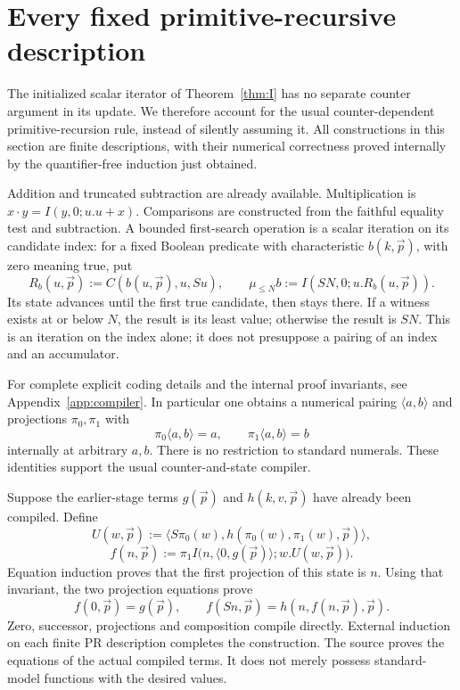 \documentclass[11pt]{article}
\theoremstyle{definition}
\begin{document}
\section{Every fixed primitive-recursive description}
\label{sec:compiler}

The initialized scalar iterator of Theorem~\ref{thm:I} has no separate
counter argument in its update. We therefore account for the usual
counter-dependent primitive-recursion rule, instead of silently assuming
it. All constructions in this section are finite descriptions, with
their numerical correctness proved internally by the quantifier-free
induction just obtained.

Addition and truncated subtraction are already available. Multiplication
is $x\cdot y=I(y,0;u.u+x)$. Comparisons are constructed from the
faithful equality test and subtraction. A bounded first-search operation
is a scalar iteration on its candidate index: for a fixed Boolean
predicate with characteristic $b(k,\vec p)$, with zero meaning true,
put
\[
 R_b(u,\vec p):=C(b(u,\vec p),u,Su),\qquad
 \mu_{\leq N}b:=I(SN,0;u.R_b(u,\vec p)).
\]
Its state advances until the first true candidate, then stays there.
If a witness exists at or below $N$, the result is its least value;
otherwise the result is $SN$. This is an iteration on the index alone;
it does not presuppose a pairing of an index and an accumulator.

For complete explicit coding details and the internal proof invariants,
see Appendix~\ref{app:compiler}. In particular one obtains a numerical
pairing $\langle a,b\rangle$ and projections $\pi_0,\pi_1$ with
\[
 \pi_0\langle a,b\rangle=a,\qquad
 \pi_1\langle a,b\rangle=b
\]
internally at arbitrary $a,b$. There is no restriction to standard
numerals. These identities support the usual counter-and-state compiler.

Suppose the earlier-stage terms $g(\vec p)$ and $h(k,v,\vec p)$ have
already been compiled. Define
\[
 U(w,\vec p):=
 \big\langle S\pi_0(w),h(\pi_0(w),\pi_1(w),\vec p)\big\rangle,
\]
\[
 f(n,\vec p):=
 \pi_1 I\bigl(n,\langle0,g(\vec p)\rangle;w.U(w,\vec p)\bigr).
\]
Equation induction proves that the first projection of this state is
$n$. Using that invariant, the two projection equations prove
\[
 f(0,\vec p)=g(\vec p),\qquad
 f(Sn,\vec p)=h(n,f(n,\vec p),\vec p).
\]
Zero, successor, projections and composition compile directly. External
induction on each finite PR description completes the construction.
The source proves the equations of the actual compiled terms. It does
not merely possess standard-model functions with the desired values.
\end{document}
